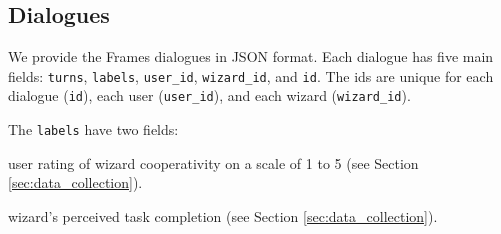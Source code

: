 \documentclass{article}
\theoremstyle{definition}
\begin{document}
\subsection{Dialogues}
We provide the Frames dialogues in JSON format. Each dialogue has five main fields: \texttt{turns}, \texttt{labels}, \texttt{user\_id}, \texttt{wizard\_id}, and \texttt{id}. The ids are unique for each dialogue (\texttt{id}), each user (\texttt{user\_id}), and each wizard (\texttt{wizard\_id}). 

The \texttt{labels} have two fields: 
\begin{description}[noitemsep,font=$\bullet$ \ttfamily\mdseries,style=unboxed]
\item [userSurveyRating] user rating of wizard cooperativity on a scale of 1 to 5 (see Section \ref{sec:data_collection}).
\item [wizardSurveyTaskSuccessful] wizard's perceived task completion (see Section \ref{sec:data_collection}). 
\end{description}
\end{document}

